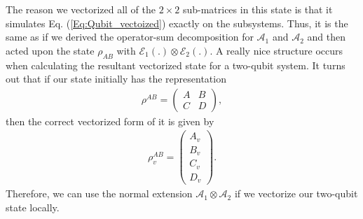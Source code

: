 \documentclass[12pt]{iopart}
\begin{document}
The reason we vectorized all of the $2 \times 2$ sub-matrices in this state is that it simulates Eq. (\ref{Eq:Qubit_vectoized}) exactly on the subsystems. Thus, it is the same as if we derived the operator-sum decomposition for $\mathcal{A}_1$ and $\mathcal{A}_2$ and then acted upon the state $\rho_{AB}$ with $\mathcal{E}_1 (.) \otimes \mathcal{E}_2(.)$. A really nice structure occurs when calculating the resultant vectorized state for a two-qubit system. It turns out that if our state initially has the representation 
\begin{align}
    \rho^{AB} = 
    \left(
    \begin{array}{cc}
        A & B \\
        C & D
    \end{array}
    \right),
\end{align}
then the correct vectorized form of it is given by
\begin{align}
\label{Eq:New_vectorization}
\rho^{AB}_v =
\left(
\begin{array}{c}
     A_v \\
     B_v \\
     C_v \\
     D_v
\end{array}
\right).
\end{align}
Therefore, we can use the normal extension $\mathcal{A}_1 \otimes \mathcal{A}_2$ if we vectorize our two-qubit state locally.
\end{document}
